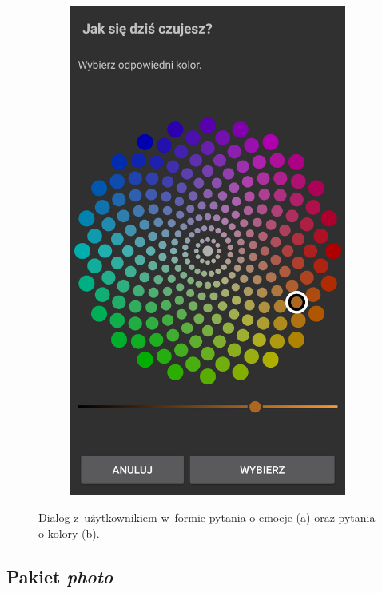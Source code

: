 \begin{figure}[H]
\begin{subfigure}{0.35\textwidth}
		\includegraphics[scale=0.13]{rozdzial3/screen-color.png}
		\subcaption{\label{subfigure_b}}
	\end{subfigure}
	\caption{ Dialog z~użytkownikiem w~formie pytania o emocje (a) oraz pytania o kolory (b).}
\end{figure}


\subsection{Pakiet \textit{photo}}

